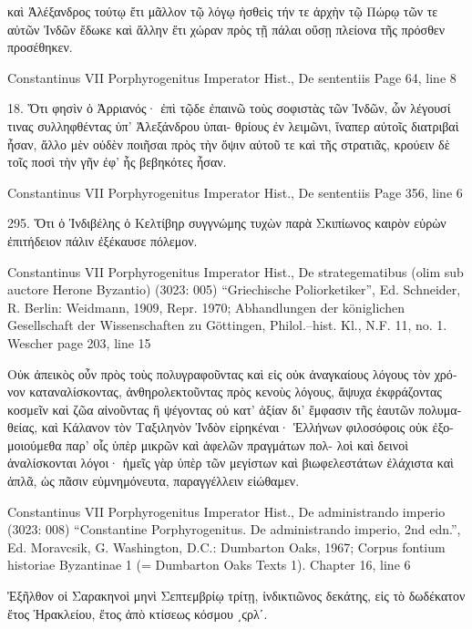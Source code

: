 \documentclass[12pt,letterpaper,twoside,final]{memoir}
\begin{document}
\begin{greek}
                                                             καὶ Ἀλέξανδρος 
τούτῳ ἔτι μᾶλλον τῷ λόγῳ ἡσθεὶς τήν τε ἀρχὴν τῷ Πώρῳ τῶν 
τε αὐτῶν Ἰνδῶν ἔδωκε καὶ ἄλλην ἔτι χώραν πρὸς τῇ πάλαι οὔσῃ 
πλείονα τῆς πρόσθεν προσέθηκεν. 



Constantinus VII Porphyrogenitus Imperator Hist., De sententiis 
Page 64, line 8

18. Ὅτι φησὶν ὁ Ἀρριανός· ἐπὶ τῷδε ἐπαινῶ τοὺς σοφιστὰς 
τῶν Ἰνδῶν, ὧν λέγουσί τινας συλληφθέντας ὑπ' Ἀλεξάνδρου ὑπαι-
θρίους ἐν λειμῶνι, ἵναπερ αὐτοῖς διατριβαὶ ἦσαν, ἄλλο μὲν οὐδὲν 
ποιῆσαι πρὸς τὴν ὄψιν αὐτοῦ τε καὶ τῆς στρατιᾶς, κρούειν δὲ 
τοῖς ποσὶ τὴν γῆν ἐφ' ἧς βεβηκότες ἦσαν. 



Constantinus VII Porphyrogenitus Imperator Hist., De sententiis 
Page 356, line 6

295. Ὅτι ὁ Ἰνδιβέλης ὁ Κελτίβηρ συγγνώμης τυχὼν παρὰ 
Σκιπίωνος καιρὸν εὑρὼν ἐπιτήδειον πάλιν ἐξέκαυσε πόλεμον. 



Constantinus VII Porphyrogenitus Imperator Hist., De strategematibus (olim sub auctore Herone Byzantio) (3023: 005)
“Griechische Poliorketiker”, Ed. Schneider, R.
Berlin: Weidmann, 1909, Repr. 1970; Abhandlungen der königlichen Gesellschaft der Wissenschaften zu Göttingen, Philol.–hist. Kl., N.F. 11, no. 1.
Wescher page 203, line 15

                                                    Οὐκ ἀπεικὸς οὖν 
πρὸς τοὺς πολυγραφοῦντας καὶ εἰς οὐκ ἀναγκαίους λόγους τὸν 
χρόνον καταναλίσκοντας, ἀνθηρολεκτοῦντας πρὸς κενοὺς λόγους, 
ἄψυχα ἐκφράζοντας κοσμεῖν καὶ ζῶα αἰνοῦντας ἢ ψέγοντας οὐ 
κατ' ἀξίαν δι' ἔμφασιν τῆς ἑαυτῶν πολυμαθείας, καὶ Κάλανον 
τὸν Ταξιληνὸν Ἰνδὸν εἰρηκέναι· Ἑλλήνων φιλοσόφοις οὐκ ἐξο-
μοιούμεθα παρ' οἷς ὑπὲρ μικρῶν καὶ ἀφελῶν πραγμάτων πολ-
λοὶ καὶ δεινοὶ ἀναλίσκονται λόγοι· ἡμεῖς γὰρ ὑπὲρ τῶν μεγίστων 
καὶ βιωφελεστάτων ἐλάχιστα καὶ ἁπλᾶ, ὡς πᾶσιν εὐμνημόνευτα, 
παραγγέλλειν εἰώθαμεν. 



Constantinus VII Porphyrogenitus Imperator Hist., De administrando imperio (3023: 008)
“Constantine Porphyrogenitus. De administrando imperio, 2nd edn.”, Ed. Moravcsik, G.
Washington, D.C.: Dumbarton Oaks, 1967; Corpus fontium historiae Byzantinae 1 (= Dumbarton Oaks Texts 1).
Chapter 16, line 6

Ἐξῆλθον οἱ Σαρακηνοὶ μηνὶ Σεπτεμβρίῳ τρίτῃ, ἰνδικτιῶνος 
δεκάτης, εἰς τὸ δωδέκατον ἔτος Ἡρακλείου, ἔτος ἀπὸ κτίσεως κόσμου 
͵ϛρλʹ. 




\end{greek}
\end{document}
